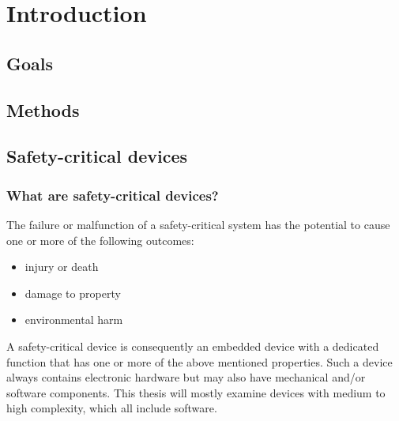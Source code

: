 
\chapter{Introduction} %

\label{Chapter1} %


\newcommand{\keyword}[1]{\textbf{#1}}
\newcommand{\tabhead}[1]{\textbf{#1}}
\newcommand{\code}[1]{\texttt{#1}}
\newcommand{\file}[1]{\texttt{\bfseries#1}}
\newcommand{\option}[1]{\texttt{\itshape#1}}

\newcommand{\mfg}{manufacturer}
\newcommand{\gls}{}

\section{Goals}


\section{Methods}


\section{Safety-critical devices}
\subsection{What are safety-critical devices?}
The failure or malfunction of a safety-critical system has the potential to cause one or more of the following outcomes:
\begin{itemize}
\item injury or death
\item damage to property
\item environmental harm
\end{itemize}
A safety-critical device is consequently an embedded device with a dedicated function that has one or more of the above mentioned properties. Such a device always contains electronic hardware but may also have mechanical and/or software components. This thesis will mostly examine devices with medium to high complexity, which all include software.

